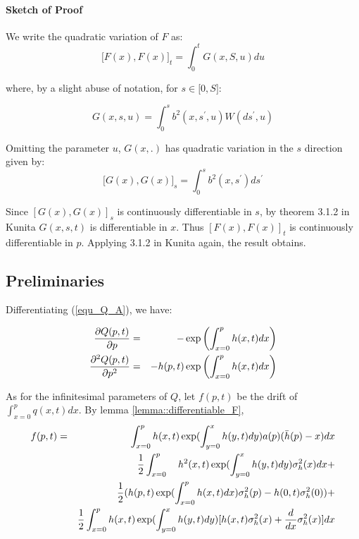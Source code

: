 \documentclass{article}
\begin{document}
\paragraph{Sketch of Proof}

We write the quadratic variation of $F$ as:%
\begin{equation*}
\lbrack F(x),F(x)]_{t}=\int_{0}^{t}G(x,S,u)du
\end{equation*}

where, by a slight abuse of notation, for $s\in \lbrack 0,S]$:

\begin{equation*}
G(x,s,u)=\int_{0}^{s}b^{2}(x,s^{\prime },u)W(ds^{\prime },u)
\end{equation*}

Omitting the parameter $u$, $G(x,.)$ has quadratic variation in the $s$
direction given by:%
\begin{equation*}
\lbrack G(x),G(x)]_{s}=\int_{0}^{s}b^{2}(x,s^{\prime })ds^{\prime }
\end{equation*}

Since $[G(x),G(x)]_{s}$ is continuously differentiable in $s$, by theorem
3.1.2 in Kunita $G(x,s,t)$ is differentiable in $x$. Thus $[F(x),F(x)]_{t}$
is continuously differentiable in $p$. Applying 3.1.2 in Kunita again, the
result obtains.

\subsection{Preliminaries}

Differentiating (\ref{equ_Q_A}), we have:

\begin{eqnarray}
\frac{\partial Q(p,t)}{\partial p} &=&-\exp \left( {\int_{x=0}^{p}h(x,t)dx}%
\right)  \label{dQdp_3} \\
\frac{\partial ^{2}Q(p,t)}{\partial p^{2}} &=&-{h(p,t)}\exp \left( {%
\int_{x=0}^{p}h(x,t)dx}\right)  \label{dQdp_2_3}
\end{eqnarray}

As for the infinitesimal parameters of $Q$, let $f(p,t)$ be the drift of $%
\int_{x=0}^{p}q(x,t)dx$. By lemma \ref{lemma::differentiable_F},
\begin{eqnarray}
f(p,t) &=&\int_{x=0}^{p}{h(x,t)}\exp ({\int_{y=0}^{x}h(y,t)dy)}a(p)(\bar{h}%
(p)-x)dx  \label{f_of_p} \\
&&\frac{1}{2}\int_{x=0}^{p}\text{ }{h}^{2}{(x,t)}\exp ({%
\int_{y=0}^{x}h(y,t)dy)}\sigma _{h}^{2}(x)dx+  \notag \\
&&\frac{1}{2}({h(p,t)}\exp ({\int_{x=0}^{p}h(x,t)dx)}\sigma _{h}^{2}(p)-{%
h(0,t)}\sigma _{h}^{2}(0))+  \notag \\
&&\frac{1}{2}\int_{x=0}^{p}{h(x,t)}\exp ({\int_{y=0}^{x}h(y,t)dy)[h(x,t)}%
\sigma _{h}^{2}(x)+\frac{d}{dx}\sigma _{h}^{2}(x)]dx  \notag
\end{eqnarray}
\end{document}
